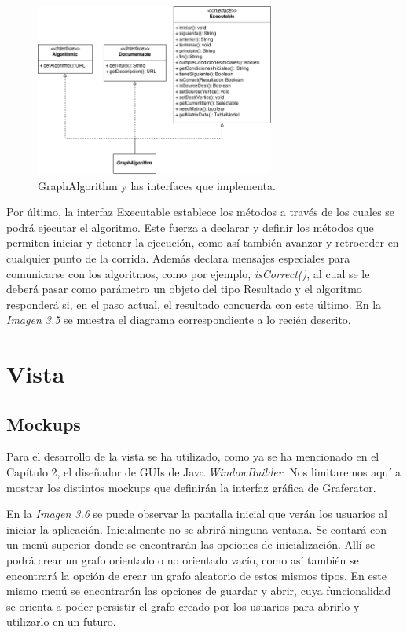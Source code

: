 \documentclass{book}
\begin{document}
\begin{figure}[H]
	\centering
	\includegraphics[width=0.70\textwidth]{images/01-02.png}
	\medskip
	\caption{GraphAlgorithm y las interfaces que implementa.}
	\medskip
\end{figure}
\bigskip

Por último, la interfaz Executable establece los métodos a través de los cuales se podrá ejecutar el algoritmo. Este fuerza a declarar y definir los métodos que permiten iniciar y detener la ejecución, como así también avanzar y retroceder en cualquier punto de la corrida. Además declara mensajes especiales para comunicarse con los algoritmos, como por ejemplo, \textit{isCorrect()}, al cual se le deberá pasar como parámetro un objeto del tipo Resultado y el algoritmo responderá si, en el paso actual, el resultado concuerda con este último. En la \textit{Imagen 3.5} se muestra el diagrama correspondiente a lo recién descrito.
\bigskip


\section{Vista}

\subsection{Mockups}

Para el desarrollo de la vista se ha utilizado, como ya se ha mencionado en el Capítulo 2, el diseñador de GUIs de Java \textit{WindowBuilder}. Nos limitaremos aquí a mostrar los distintos mockups que definirán la interfaz gráfica de Graferator.
\par
En la \textit{Imagen 3.6} se puede observar la pantalla inicial que verán los usuarios al iniciar la aplicación. Inicialmente no se abrirá ninguna ventana. Se contará con un menú superior donde se encontrarán las opciones de inicialización. Allí se podrá crear un grafo orientado o no orientado vacío, como así también se encontrará la opción de crear un grafo aleatorio de estos mismos tipos. En este mismo menú se encontrarán las opciones de guardar y abrir, cuya funcionalidad se orienta a poder persistir el grafo creado por los usuarios para abrirlo y utilizarlo en un futuro.
\bigskip
\end{document}

